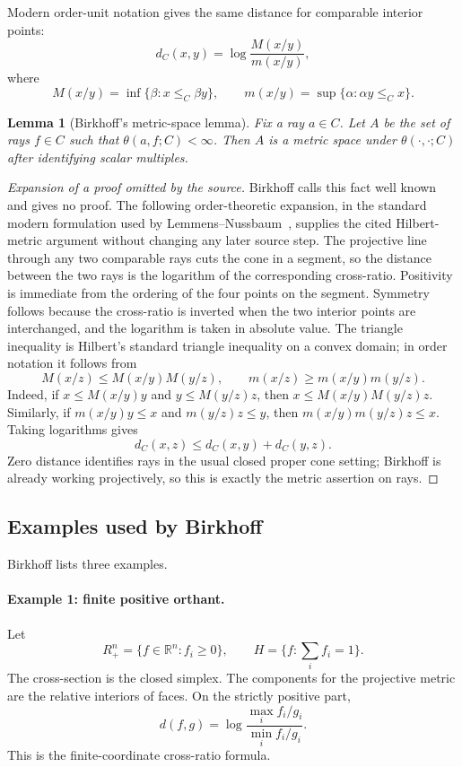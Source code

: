 \documentclass[11pt]{article}
\newtheorem{lemma}{Lemma}
\newcommand{\R}{\mathbb{R}}
\begin{document}
Modern order-unit notation gives the same distance for comparable interior points:
\[
  d_C(x,y)=\log\frac{M(x/y)}{m(x/y)},
\]
where
\[
  M(x/y)=\inf\{\beta:x\le_C \beta y\},
  \qquad
  m(x/y)=\sup\{\alpha:\alpha y\le_C x\}.
\]

\begin{lemma}[Birkhoff's metric-space lemma]
Fix a ray \(a\in C\).  Let \(A\) be the set of rays \(f\in C\) such that \(\theta(a,f;C)<\infty\).  Then \(A\) is a metric space under \(\theta(\cdot,\cdot;C)\) after identifying scalar multiples.
\end{lemma}

\begin{proof}[Expansion of a proof omitted by the source]
Birkhoff calls this fact well known and gives no proof.  The following order-theoretic expansion, in the standard modern formulation used by
Lemmens--Nussbaum~\cite{LemmensNussbaum2013}, supplies the cited Hilbert-metric argument without
changing any later source step.
The projective line through any two comparable rays cuts the cone in a segment, so the distance between the two rays is the logarithm of the corresponding cross-ratio.  Positivity is immediate from the ordering of the four points on the segment.  Symmetry follows because the cross-ratio is inverted when the two interior points are interchanged, and the logarithm is taken in absolute value.  The triangle inequality is Hilbert's standard triangle inequality on a convex domain; in order notation it follows from
\[
  M(x/z)\le M(x/y)M(y/z),
  \qquad
  m(x/z)\ge m(x/y)m(y/z).
\]
Indeed, if \(x\le M(x/y)y\) and \(y\le M(y/z)z\), then \(x\le M(x/y)M(y/z)z\).  Similarly, if \(m(x/y)y\le x\) and \(m(y/z)z\le y\), then \(m(x/y)m(y/z)z\le x\).  Taking logarithms gives
\[
  d_C(x,z)\le d_C(x,y)+d_C(y,z).
\]
Zero distance identifies rays in the usual closed proper cone setting; Birkhoff is already working projectively, so this is exactly the metric assertion on rays.
\end{proof}

\subsection{Examples used by Birkhoff}
Birkhoff lists three examples.

\paragraph{Example 1: finite positive orthant.}
Let
\[
  R_+^n=\{f\in\R^n:f_i\ge0\},
  \qquad H=\{f:\sum_i f_i=1\}.
\]
The cross-section is the closed simplex.  The components for the projective metric are the relative interiors of faces.  On the strictly positive part,
\[
  d(f,g)=\log\frac{\max_i f_i/g_i}{\min_i f_i/g_i}.
\]
This is the finite-coordinate cross-ratio formula.
\end{document}
